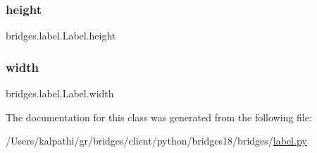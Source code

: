 \mbox{\label{classbridges_1_1label_1_1_label_a2bf622aa77b4ad7d6918db99a8bfd4da}} 
\subsubsection{\texorpdfstring{height}{height}}
{\footnotesize\ttfamily bridges.\+label.\+Label.\+height}

\mbox{\label{classbridges_1_1label_1_1_label_a8cbf497432889744a3690eb75ebf8ded}} 
\subsubsection{\texorpdfstring{width}{width}}
{\footnotesize\ttfamily bridges.\+label.\+Label.\+width}



The documentation for this class was generated from the following file\+:\begin{DoxyCompactItemize}
\item 
/\+Users/kalpathi/gr/bridges/client/python/bridges18/bridges/\mbox{\hyperlink{label_8py}{label.\+py}}\end{DoxyCompactItemize}
